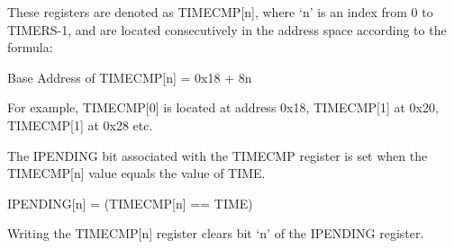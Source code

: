 These registers are denoted as TIMECMP[n], where `n' is an index
from 0 to TIMERS-1, and are located consecutively in the address space
according to the formula:

Base Address of TIMECMP[n] = 0x18 + 8n

For example, TIMECMP[0] is located at address 0x18, TIMECMP[1]
at 0x20, TIMECMP[1] at 0x28 etc.

The IPENDING bit associated with the TIMECMP register is set when the
TIMECMP[n] value equals the value of TIME.

IPENDING[n] = (TIMECMP[n] == TIME)

Writing the TIMECMP[n] register clears bit `n' of the IPENDING
register.

